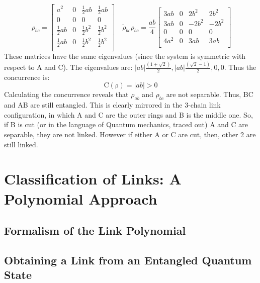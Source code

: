 \documentclass{scrartcl}
\begin{document}
    \begin{equation*}\
        \rho_{bc} =
        \left[
        \begin{array}{cccc}
        a^{2} & 0 & \frac{1}{2} a b & \frac{1}{2} a b \\[0.3cm]
        0 & 0 & 0 & 0 \\[0.3cm]
        \frac{1}{2} a b & 0 & \frac{1}{2} b^{2} & \frac{1}{2} b^{2} \\[0.3cm]
        \frac{1}{2} a b & 0 & \frac{1}{2} b^{2} & \frac{1}{2} b^{2} \\[0.3cm]
        \end{array}
        \right] \quad \tilde{\rho}_{bc}\rho_{bc} =\frac{ab}{4}\left[
            \begin{array}{cccc}
            3 a b& 0 & 2 b^{2} & 2 b^{2} \\[0.5cm]
           3 a b & 0 & -2 b^{2} & -2 b^{2} \\[0.5cm]
            0 & 0 & 0 & 0 \\[0.5cm]
            4 a^{2} & 0 & 3 a b& 3 a b\\[0.5cm]
            \end{array}
            \right]
        \end{equation*}
\noindent
These matrices have the same eigenvalues (since the system is symmetric with respect to A and C). The eigenvalues are: $|ab|\frac{(1 + \sqrt{2})}{2},|ab| \frac{(\sqrt{2} - 1)}{2},0,0$. Thus the concurrence is: $$\mathrm{C(\rho)} = |ab|>0$$
\noindent
Calculating the concurrence reveals that $\rho_{ab}$ and $\rho_{bc}$ are not separable. Thus, BC and AB are still entangled. This is clearly mirrored in the 3-chain link configuration, in which A and C are the outer rings and B is the middle one. So, if B is cut (or in the language of Quantum mechanics, traced out) A and C are separable, they are not linked. However if either A or C are cut, then, other 2 are still linked.


\section{Classification of Links: A Polynomial Approach}
\subsection{Formalism of the Link Polynomial}
\subsection{Obtaining a Link from an Entangled Quantum State}\label{link_from_state}
\end{document}
